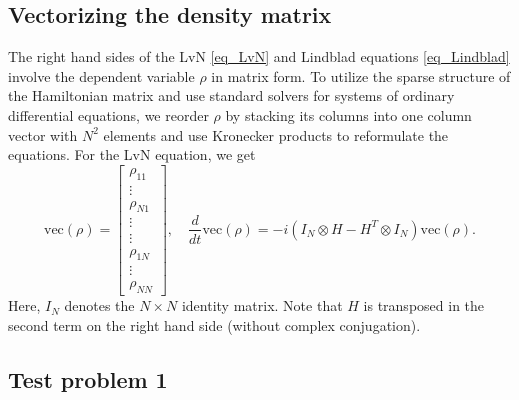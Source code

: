 \documentclass[11pt]{article}
\begin{document}
\subsection{Vectorizing the density matrix}

The right hand sides of the LvN \eqref{eq_LvN} and Lindblad equations \eqref{eq_Lindblad} involve
the dependent variable $\rho$ in matrix form. To utilize the sparse structure of the
Hamiltonian matrix and use standard solvers for systems of ordinary differential equations, we
reorder $\rho$ by stacking its columns into one column vector with $N^2$ elements and use Kronecker
products to reformulate the equations. For the LvN equation, we get
\[
\mbox{vec$(\rho)$} =
\begin{bmatrix}
  \rho_{11}\\
  \vdots \\
  \rho_{N1} \\
  \vdots\\
  \vdots\\
  \rho_{1N} \\
  \vdots \\
  \rho_{NN}
\end{bmatrix},\quad
%
\frac{d}{dt}\mbox{vec$(\rho)$} = -i\left( I_N\otimes H - H^T \otimes I_N \right)\mbox{vec$(\rho)$}.
\]
Here, $I_N$ denotes the $N\times N$ identity matrix. Note that $H$ is transposed in the second term
on the right hand side (without complex conjugation).

\subsection{Test problem 1}
\end{document}
